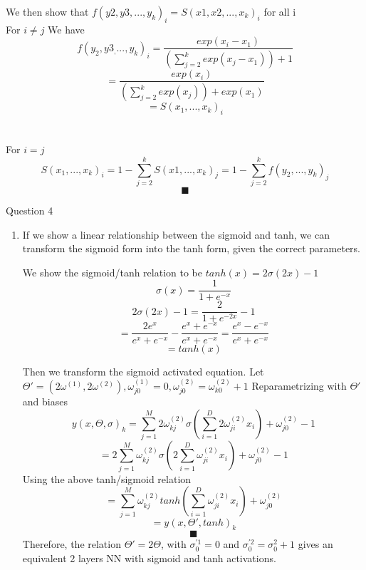 \documentclass{article}
\begin{document}
\begin{enumerate}
We then show that   $f(y2,y3,...,y_k)_i = S(x1,x2, ... , x_k)_i$ for all i\\

For $ i \neq j$ We have $$ f(y_2,y3_,...,y_k)_i = \frac{exp(x_i - x_1)}{(\sum^k_{j=2} exp(x_j - x_1)) + 1}$$ $$ = \frac{exp(x_i)}{(\sum^k_{j=2} exp(x_j)) + exp(x_1)}$$ $$= S(x_1, ..., x_k)_i$$\\ \\

For $ i = j$ $$ S(x_1, ..., x_k)_i = 1 - \sum^k_{j=2} S(x1, ..., x_k)_j = 1 - \sum^k_{j=2} f(y_2, ..., y_k)_j $$
	$$\blacksquare$$
    \vspace{0.5cm}
\end{enumerate}


\vspace{1cm}
 Question 4 \\

  \begin{enumerate}

  \item 
	If we show a linear relationship between the sigmoid and tanh, we can transform the sigmoid form into the tanh form, given the correct parameters.

	We show the sigmoid/tanh relation to be $tanh(x) = 2\sigma(2x) - 1$ $$ \sigma(x) = \frac{1}{1 + e^{-x}}$$ $$ 2 \sigma(2x) - 1 = \frac{2}{1 + e^{-2x}} -1$$ $$ = \frac{2e^{x}}{e^x + e^{-x}} - \frac{e^x + e^{-x}}{e^x + e^{-x}} = \frac{e^x - e^{-x}}{e^x + e^{-x}}$$ $$ = tanh(x)$$


	Then we transform the sigmoid activated equation. Let $\Theta' = (2\omega^{(1)}, 2\omega^{(2)}), \omega^{(1)}_{j0} = 0,  \omega^{(2)}_{j0} = \omega^{(2)}_{k0} + 1$ 		           Reparametrizing with $\Theta'$ and biases  $$ y(x,\Theta,\sigma)_k =\sum^M_{j=1} 2\omega^{(2)}_{kj} \sigma (\sum^D_{i=1} 2\omega^{(2)}_{ji}x_i) +  \omega^{(2)}				_{j0} - 1$$ $$ =2\sum^M_{j=1} \omega^{(2)}_{kj} \sigma (2\sum^D_{i=1} \omega^{(2)}_{ji}x_i) +  \omega^{(2)}_{j0} - 1$$ Using the above tanh/sigmoid relation
	 $$ =\sum^M_{j=1} \omega^{(2)}_{kj} tanh (\sum^D_{i=1} \omega^{(2)}_{ji}x_i) +  \omega^{(2)}_{j0} $$ $$ = y(x,\Theta',tanh)_k$$
	$$\blacksquare$$
	Therefore, the relation $\Theta' = 2\Theta$, with $\sigma^{'1}_0 = 0$ and $\sigma^{'2}_0 =  \sigma^2_0 + 1$ gives an equivalent 2 layers NN with sigmoid and tanh activations.
	

    \vspace{0.5cm}

  \end{enumerate}
\end{document}
